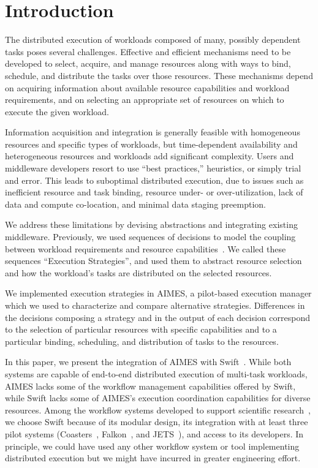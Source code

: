\documentclass[10pt, conference, compsocconf]{IEEEtran}
\begin{document}
\section{Introduction}\label{sec:intro}

The distributed execution of workloads composed of many, possibly dependent
tasks poses several challenges. Effective and efficient mechanisms need to be
developed to select, acquire, and manage resources along with ways to bind,
schedule, and distribute the tasks over those resources. These mechanisms
depend on acquiring information about available resource capabilities and
workload requirements, and on selecting an appropriate set of resources on
which to execute the given workload.

Information acquisition and integration is generally feasible with
homogeneous resources and specific types of workloads, but time-dependent
availability and heterogeneous resources and workloads add significant
complexity. Users and middleware developers resort to use ``best practices,''
heuristics, or simply trial and error. This leads to suboptimal distributed
execution, due to issues such as inefficient resource and task binding,
resource under- or over-utilization, lack of data and compute co-location,
and minimal data staging preemption.

We address these limitations by devising abstractions and integrating
existing middleware. Previously, we used sequences of decisions to model the
coupling between workload requirements and resource
capabilities~\cite{turilli2016integrating}. We called these sequences
``Execution Strategies'', and used them to abstract resource selection and
how the workload's tasks are distributed on the selected resources.

We implemented execution strategies in AIMES, a pilot-based execution manager
which we used to characterize and compare alternative strategies. Differences
in the decisions composing a strategy and in the output of each decision
correspond to the selection of particular resources with specific
capabilities and to a particular binding, scheduling, and distribution of
tasks to the resources.

In this paper, we present the integration of AIMES with
Swift~\cite{wilde2011swift}. While both systems are capable of end-to-end
distributed execution of multi-task workloads, AIMES lacks some of the workflow
management capabilities offered by Swift, while Swift lacks some of AIMES's
execution coordination capabilities for diverse resources. Among the workflow
systems developed to support scientific research~\cite{taylor2007workflows}, we
choose Swift because of its modular design, its integration with at least three
pilot systems (Coasters~\cite{hategan2011coasters},
Falkon~\cite{raicu2007falkon}, and JETS~\cite{wozniak2013jets}), and access to
its developers. In principle, we could have used any other workflow system or
tool implementing distributed execution but we might have incurred in greater
engineering effort.
\end{document}
